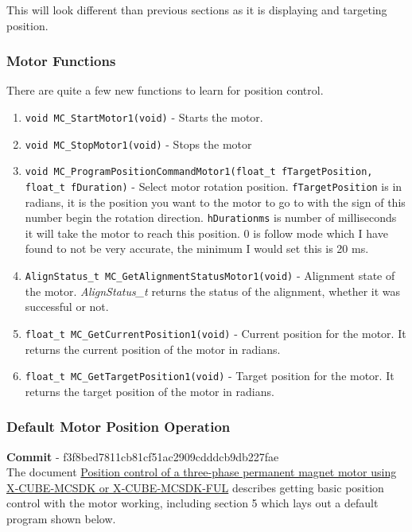 \documentclass[10pt]{article}
\begin{document}
            This will look different than previous sections as it is displaying and targeting position.
			\FloatBarrier \subsubsection{Motor Functions}
                There are quite a few new functions to learn for position control.
                \begin{enumerate}
                    \item \texttt{void MC\_StartMotor1(void)} - Starts the motor.
                    \item \texttt{void MC\_StopMotor1(void)} - Stops the motor
                    \item \texttt{void MC\_ProgramPositionCommandMotor1(float\_t fTargetPosition, float\_t fDuration)} - Select motor rotation position. \texttt{fTargetPosition} is in radians, it is the position you want to the motor to go to with the sign of this number begin the rotation direction. \texttt{hDurationms} is number of milliseconds it will take the motor to reach this position. 0 is follow mode which I have found to not be very accurate, the minimum I would set this is 20 ms.
                    \item \texttt{AlignStatus\_t MC\_GetAlignmentStatusMotor1(void)} - Alignment state of the motor. \emph{AlignStatus\_t} returns the status of the alignment, whether it was successful or not. 
                    \item \texttt{float\_t MC\_GetCurrentPosition1(void)} - Current position for the motor. It returns the current position of the motor in radians.
                    \item \texttt{float\_t MC\_GetTargetPosition1(void)} - Target position for the motor. It returns the target position of the motor in radians.
                \end{enumerate}
			\FloatBarrier \subsubsection{Default Motor Position Operation}
                \textbf{Commit} - f3f8bed7811cb81cf51ac2909cdddcb9db227fae \\
                The document \href{https://www.st.com/resource/en/application_note/dm00691525-position-control-of-a-threephase-permanent-magnet-motor-using-xcubemcsdk-or-xcubemcsdkful-stmicroelectronics.pdf}{Position control of a three-phase permanent magnet motor using X‑CUBE‑MCSDK or X‑CUBE‑MCSDK-FUL} describes getting basic position control with the motor working, including section 5 which lays out a default program shown below.
\end{document}

